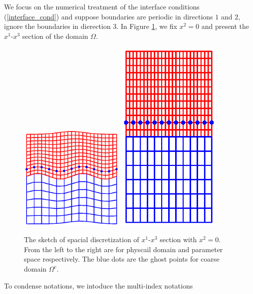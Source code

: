 We focus on the numerical treatment of the interface conditions (\ref{interface_cond}) and suppose boundaries are periodic in directions $1$ and $2$, ignore the boundaries in dierection $3$. In Figure \ref{section_discretization}, we fix $x^2 = 0$ and present the $x^1$-$x^3$ section of the domain $\Omega$.
\begin{figure}[htbp]
	\centering
	\includegraphics[width=0.45\textwidth,trim={1.0cm 2.0cm 1.0cm 1.8cm}, clip]{physical_section_discretization.eps}
	\includegraphics[width=0.45\textwidth,trim={1.0cm 2.0cm 1cm 1.8cm}, clip]{parameter_section_discretization.eps}
	\caption{The sketch of spacial discretization of $x^1$-$x^3$ section with $x^2 = 0$. From the left to the right are for physcail domain and parameter space respectively. The blue dots are the ghost points for coarse domain $\Omega^c$.}\label{section_discretization}
\end{figure}
 To condense notations, we intoduce the multi-index notations

